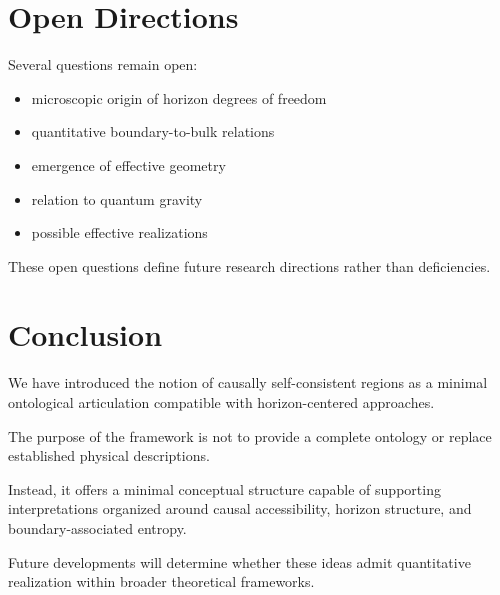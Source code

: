 \documentclass[12pt,a4paper]{article}
\begin{document}
\section{Open Directions}

Several questions remain open:

\begin{itemize}
  \item microscopic origin of horizon degrees of freedom
  \item quantitative boundary-to-bulk relations
  \item emergence of effective geometry
  \item relation to quantum gravity
  \item possible effective realizations
\end{itemize}

These open questions define future research directions rather than deficiencies.

\section{Conclusion}

We have introduced the notion of causally self-consistent regions as a minimal ontological articulation compatible with horizon-centered approaches.

The purpose of the framework is not to provide a complete ontology or replace established physical descriptions.

Instead, it offers a minimal conceptual structure capable of supporting interpretations organized around causal accessibility, horizon structure, and boundary-associated entropy.

Future developments will determine whether these ideas admit quantitative realization within broader theoretical frameworks.
\end{document}
